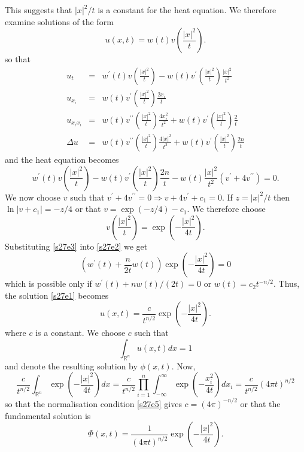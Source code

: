 \documentclass{article}
\theoremstyle{plain}
\numberwithin{thm}{section}
\theoremstyle{plain}
\numberwithin{prop}{section}
\theoremstyle{definition}
\numberwithin{defn}{section}
\theoremstyle{remark}
\numberwithin{equation}{section}
\begin{document}
This suggests that $|x|^2/t$ is a constant for the heat equation. We therefore examine solutions of the form
\begin{equation}\label{s27e1}
u(x, t) = w(t)v\left(\frac{|x|^2}{t}\right).
\end{equation}
so that
\begin{eqnarray*}
u_t &=& w^\prime(t)v\left(\frac{|x|^2}{t}\right) - w(t)v^\prime\left(\frac{|x|^2}{t}\right)\frac{|x|^2}{t^2} \\
u_{x_i} &=& w(t)v^\prime\left(\frac{|x|^2}{t}\right)\frac{2x_i}{t} \\
u_{x_ix_i}&=& w(t)v^{\prime\prime}\left(\frac{|x|^2}{t}\right)\frac{4x_i^2}{t^2} + 
 w(t)v^\prime\left(\frac{|x|^2}{t}\right)\frac{2}{t} \\
\Delta u &=& w(t)v^{\prime\prime}\left(\frac{|x|^2}{t}\right)\frac{4|x|^2}{t^2} + 
 w(t)v^\prime\left(\frac{|x|^2}{t}\right)\frac{2n}{t}
\end{eqnarray*}
and the heat equation becomes
\begin{equation}\label{s27e2}
w^\prime(t)v\left(\frac{|x|^2}{t}\right) - w(t)v^\prime\left(\frac{|x|^2}{t}\right)\frac{2n}{t} - 
w(t)\frac{|x|^2}{t^2}\left(v^\prime + 4v^{\prime\prime}\right) = 0.
\end{equation}
We now choose $v$ such that $v^\prime + 4v^{\prime\prime} = 0 \Rightarrow v + 4v^\prime + c_1 = 0$. If 
$z = |x|^2/t$ then $\ln|v + c_1| = -z/4$ or that $v = \exp(-z/4) - c_1$. We therefore choose
\begin{equation}\label{s27e3}
v\left(\frac{|x|^2}{t}\right) = \exp\left(-\frac{|x|^2}{4t}\right).
\end{equation}
Substituting \eqref{s27e3} into \eqref{s27e2} we get
\[
\left(w^\prime(t) + \frac{n}{2t}w(t)\right)\exp\left(-\frac{|x|^2}{4t}\right) = 0
\]
which is possible only if $w^\prime(t) + nw(t)/(2t) = 0$ or $w(t) = c_2t^{-n/2}$. Thus, the solution \eqref{s27e1}
becomes
\begin{equation}\label{s27e4}
u(x, t) = \frac{c}{t^{n/2}}\exp\left(-\frac{|x|^2}{4t}\right).
\end{equation}
where $c$ is a constant. We choose $c$ such that
\begin{equation}\label{s27e5}
\int_{\mathbb{R}^n}u(x, t)dx = 1
\end{equation}
and denote the resulting solution by $\phi(x, t)$. Now,
\[
\frac{c}{t^{n/2}}\int_{\mathbb{R}^n}\exp\left(-\frac{|x|^2}{4t}\right)dx = 
\frac{c}{t^{n/2}}\prod_{i=1}^n\int_{-\infty}^\infty \exp\left(-\frac{x_i^2}{4t}\right)dx_i = 
\frac{c}{t^{n/2}}(4\pi t)^{n/2}
\]
so that the normalisation condition \eqref{s27e5} gives $c = (4\pi)^{-n/2}$ or that the fundamental solution is
\begin{equation}\label{s27e6}
\Phi(x, t) = \frac{1}{(4\pi t)^{n/2}}\exp\left(-\frac{|x|^2}{4t}\right).
\end{equation}
\end{document}
